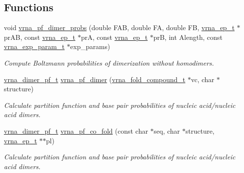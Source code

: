 \subsection*{Functions}
\begin{DoxyCompactItemize}
\item 
void \hyperlink{group__pf__cofold_gaa1e39e73afb51fbaf4ae38f0c066c46b}{vrna\+\_\+pf\+\_\+dimer\+\_\+probs} (double F\+AB, double FA, double FB, \hyperlink{group__struct__utils_gab9ac98ab55ded9fb90043b024b915aca}{vrna\+\_\+ep\+\_\+t} $\ast$pr\+AB, const \hyperlink{group__struct__utils_gab9ac98ab55ded9fb90043b024b915aca}{vrna\+\_\+ep\+\_\+t} $\ast$prA, const \hyperlink{group__struct__utils_gab9ac98ab55ded9fb90043b024b915aca}{vrna\+\_\+ep\+\_\+t} $\ast$prB, int Alength, const \hyperlink{group__energy__parameters_ga01d8b92fe734df8d79a6169482c7d8d8}{vrna\+\_\+exp\+\_\+param\+\_\+t} $\ast$exp\+\_\+params)
\begin{DoxyCompactList}\small\item\em Compute Boltzmann probabilities of dimerization without homodimers. \end{DoxyCompactList}\item 
\hyperlink{group__pf__cofold_ga444df1587c9a2ca15b8eb25188f629c3}{vrna\+\_\+dimer\+\_\+pf\+\_\+t} \hyperlink{group__pf__cofold_ga4e5c7d06c302a7c59fc0d64dc142ca63}{vrna\+\_\+pf\+\_\+dimer} (\hyperlink{group__fold__compound_ga1b0cef17fd40466cef5968eaeeff6166}{vrna\+\_\+fold\+\_\+compound\+\_\+t} $\ast$vc, char $\ast$structure)
\begin{DoxyCompactList}\small\item\em Calculate partition function and base pair probabilities of nucleic acid/nucleic acid dimers. \end{DoxyCompactList}\item 
\hyperlink{group__pf__cofold_ga444df1587c9a2ca15b8eb25188f629c3}{vrna\+\_\+dimer\+\_\+pf\+\_\+t} \hyperlink{group__pf__cofold_gaf2b846f7ac382686f35ff7b9202fdd5c}{vrna\+\_\+pf\+\_\+co\+\_\+fold} (const char $\ast$seq, char $\ast$structure, \hyperlink{group__struct__utils_gab9ac98ab55ded9fb90043b024b915aca}{vrna\+\_\+ep\+\_\+t} $\ast$$\ast$pl)
\begin{DoxyCompactList}\small\item\em Calculate partition function and base pair probabilities of nucleic acid/nucleic acid dimers. \end{DoxyCompactList}\end{DoxyCompactItemize}
